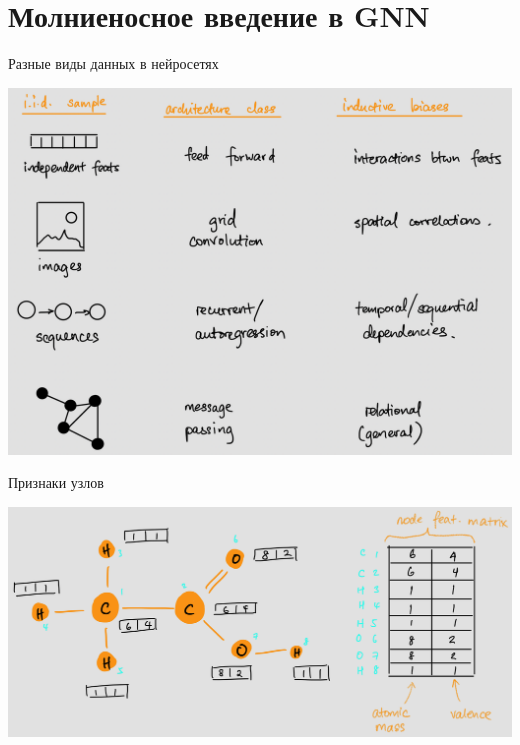 \documentclass[11pt,aspectratio=169,handout]{beamer}
\begin{document}
\section{Молниеносное введение в GNN}

\begin{frame}{Разные виды данных в нейросетях \cite{GNN}}

\begin{center}
\includegraphics[scale=0.12]{images/inductive-biases.png}
\end{center}

\end{frame}

\begin{frame}{Признаки узлов}

\begin{center}
\includegraphics[scale=0.15]{images/ethanoic-acid-features.png}
\end{center}

\end{frame}
\end{document}
